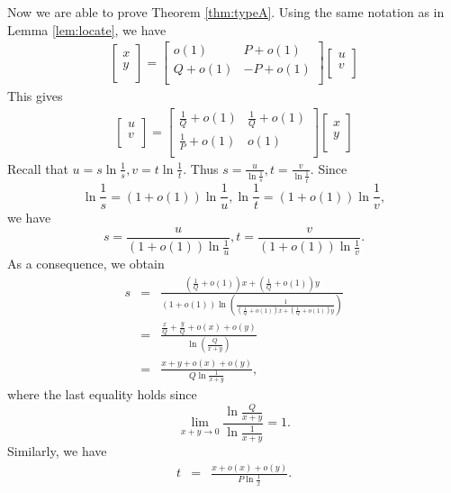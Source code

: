 \documentclass[11pt]{amsart}
\theoremstyle{plain}
\begin{document}
Now we are able to prove Theorem \ref{thm:typeA}. 
Using the same notation as in Lemma \ref{lem:locate}, we have 
 \begin{eqnarray*}
\left[ {\begin{array}{cc}
    x \\
    y \\
  \end{array} } \right] = \left[ {\begin{array}{cc}
    o(1) & P+ o(1)  \\
    Q +o(1) & -P +o(1) \\
  \end{array} } \right]  \left[ {\begin{array}{cc}
    u \\
    v \\
  \end{array} } \right]
\end{eqnarray*} 
   This gives 
      \begin{eqnarray*}
\left[ {\begin{array}{cc}
    u \\
    v \\
  \end{array} } \right] = \left[ {\begin{array}{cc}
    \frac{1}{Q}+o(1) & \frac{1}{Q}+o(1) \\
    \frac{1}{P}+o(1) & o(1) \\
  \end{array} } \right]  \left[ {\begin{array}{cc}
    x \\
    y \\
  \end{array} } \right]
\end{eqnarray*} 
     Recall that $u=s\ln \frac{1}{s}, v= t\ln \frac{1}{t}$.
     Thus $s=\frac{u}{\ln \frac{1}{s}}, t=\frac{v}{\ln \frac{1}{t}}$. 
     Since
     $$\ln{\frac{1}{s}}=(1+o(1))\ln{\frac{1}{u}}, \ln{\frac{1}{t}}=(1+o(1))\ln{\frac{1}{v}},$$
      we have 
       $$s=\frac{u}{(1+o(1))\ln{\frac{1}{u}}},t=\frac{v}{(1+o(1))\ln{\frac{1}{v}}}.$$
    As a consequence, we obtain
    \begin{eqnarray*}
      s &=& \frac{\left( \frac{1}{Q}+o(1)\right) x + \left( \frac{1}{Q}+o(1)\right) y}{\left(1+o(1)\right) \ln \left( \frac{1}{\left( \frac{1}{Q}+o(1)\right) x + \left( \frac{1}{Q}+o(1)\right) y}\right)} \\
      &=& \frac{\frac{x}{Q}+\frac{y}{Q}+o(x)+o(y)}{\ln \left(\frac{Q}{x+y}\right)} \\
      &=& \frac{x+y+o(x)+o(y)}{Q\ln\frac{1}{x+y}},
       \end{eqnarray*} 
      where the last equality holds since 
       $$\lim_{x+y \to 0} \frac{\ln \frac{Q}{x+y}}{\ln  \frac{1}{x+y}}=1.$$
      Similarly, we have  
         \begin{eqnarray*}
         t &=&  \frac{x + o(x)+o(y)}{P \ln \frac{1}{x}}.
    \end{eqnarray*}  
    
\end{document}

